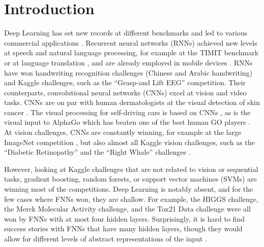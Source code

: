 \documentclass{article}
\begin{document}
\section*{Introduction}
\label{sec:introduction}
Deep Learning has set new records at different benchmarks and
led to various commercial applications \citep{bib:Lecun2015,bib:Schmidhuber2015}. 
Recurrent neural networks (RNNs) \citep{bib:Hochreiter1997} 
achieved new levels at speech and natural language processing, 
for example at the TIMIT benchmark \citep{bib:Graves2013} or at 
language translation \citep{bib:Sutskever2014}, and 
are already employed in mobile devices \citep{bib:Sak2015}. 
RNNs have won handwriting recognition challenges (Chinese and Arabic
handwriting) \cite{bib:Schmidhuber2015, bib:Graves2009,bib:Cirecsan2015}
and Kaggle challenges,
such as the ``Grasp-and Lift EEG'' competition. 
Their counterparts, convolutional neural networks (CNNs) \citep{bib:Lecun1995} excel
at vision and video tasks. 
CNNs are on par with human dermatologists at the 
visual detection of skin cancer \citep{bib:Esteva2017}. 
The visual processing for self-driving cars is based on CNNs \citep{bib:Huval2015},
as is the visual input to AlphaGo which has beaten
one of the best human GO players \citep{bib:Silver2016}.
At vision challenges, CNNs are constantly winning, for example at 
the large ImageNet competition \citep{bib:Krizhevsky2012, bib:He2015res}, but 
also almost all Kaggle vision challenges, such as  the ``Diabetic Retinopathy'' and 
the ``Right Whale'' challenges \citep{bib:Dugan2016,bib:Gulshan2016}. 

However, looking at Kaggle challenges that are not related to vision or sequential
tasks, gradient boosting, random forests, or support vector machines (SVMs) are winning most of the competitions. 
Deep Learning is notably absent, and for the few cases where FNNs won, 
they are shallow. For example, the HIGGS challenge,
the Merck Molecular Activity challenge, and the 
Tox21 Data challenge were all won by FNNs with at most four hidden layers.
Surprisingly, it is hard to find success stories with FNNs that
have many hidden layers, though they would allow for different levels
of abstract representations 
of the input \citep{bib:Bengio2013b}.
\end{document}

